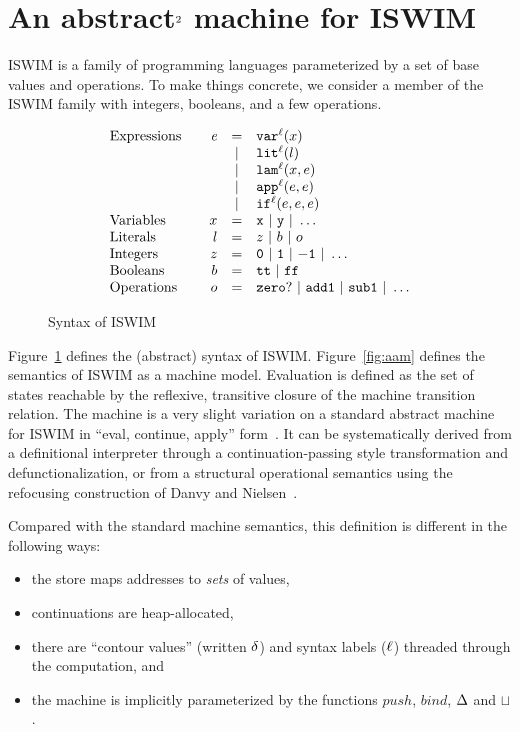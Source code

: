 \documentclass[preprint,onecolumn,9pt]{sigplanconf} %
\begin{document}
\section{An abstract$^{\text 2}$ machine for ISWIM}
\label{sec:aam}


ISWIM is a family of programming languages parameterized by a set of
base values and operations.  To make things concrete, we consider a
member of the ISWIM family with integers, booleans, and a few
operations.

\begin{figure}
\[
\begin{array}{l@{\qquad}rcl}
\text{Expressions} & \mathit{e} &=& \svar[^\mlab]\mvar\\
&&|& \slit[^\mlab]\mlit\\
&&|& \slam[^\mlab]\mvar\mexp\\
&&|& \sapp[^\mlab]\mexp\mexp \\
&&|& \sif[^\mlab]\mexp\mexp\mexp \\
\text{Variables}&\mvar &=& \syntax{x}\ |\ \syntax{y}\ |\ \dots\\
\text{Literals}&\mlit &=& \mnum\ |\ \mbln\ |\ \mop\\
\text{Integers}&\mnum &=& \syntax{0}\ |\ \syntax{1}\ |\ \syntax{-1}\ |\ \dots\\
\text{Booleans}&\mbln &=& \strue\ |\ \sfalse\\
\text{Operations}&\mop &=& \syntax{zero?}\ |\ \syntax{add1}\ |\ \syntax{sub1}\ |\ \dots
\end{array}
\]
\caption{Syntax of ISWIM}
\label{fig:syntax}
\end{figure}

Figure~\ref{fig:syntax} defines the (abstract) syntax of ISWIM.
Figure~\ref{fig:aam} defines the semantics of ISWIM as a machine
model.  Evaluation is defined as the set of states reachable by the
reflexive, transitive closure of the machine transition relation.  The
machine is a very slight variation on a standard abstract machine for
ISWIM in ``eval, continue, apply''
form~\cite{dvanhorn:Danvy:DSc}.  It can be
systematically derived from a definitional interpreter through a
continuation-passing style transformation and defunctionalization, or
from a structural operational semantics using the refocusing
construction of Danvy and
Nielsen~\cite{dvanhorn:Danvy-Nielsen:RS-04-26}.

Compared with the standard machine semantics, this definition is
different in the following ways:
\begin{itemize}
\item the store maps addresses to \emph{sets} of values,
\item continuations are heap-allocated,
\item there are ``contour values'' (written ${\delta}$) and syntax
  labels (${\ell}$) threaded through the computation, and
\item the machine is implicitly parameterized by the functions
  $\mathit{push}$, $\mathit{bind}$, $\Delta$ and $\sqcup$.
\end{itemize}
\end{document}
